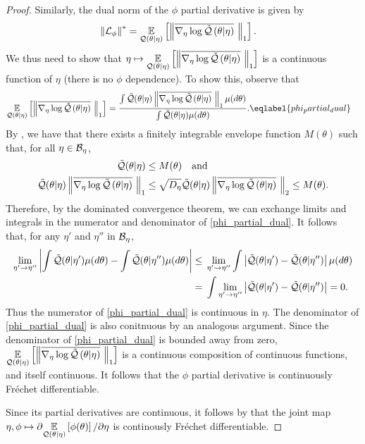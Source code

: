\begin{lem}
\begin{proof}
Similarly, the dual norm of the $\phi$ partial derivative is given by
%
\begin{align*}
%
\norm{\linop_\phi}^* ={}& \expect{\q(\theta \vert \eta)}
       {\norm{\lqgradbar{\theta \vert \eta}}_1}.
%
\end{align*}
%
We thus need to show that $\eta \mapsto \underset{\mathcal{Q}(\theta \vert \eta)}{\mathbb{E}}\left[\left\Vert\overline{{\nabla_\eta \log \tilde{\mathcal{Q}}}\left(\theta \vert \eta\right)}\,\,\right\Vert_1\right]$ is a continuous function of $\eta$
(there is no $\phi$ dependence).  To show this, observe that
%
\begin{align}
%
\expect{\q(\theta \vert \eta)}
       {\norm{\lqgradbar{\theta \vert \eta}}_1} ={}&
\frac{\int \qtil(\theta \vert \eta)
           \norm{\lqgradbar{\theta \vert \eta}}_1 \mu(d\theta)}
     {\int \qtil(\theta \vert \eta) \mu(d\theta)}.
    \eqlabel{phi_partial_dual}
%
\end{align}
%
By , we have that there exists a finitely integrable
envelope function $M(\theta)$ such that, for all $\eta \in \mathcal{B}_\eta$,
%
\begin{align*}
%
\qtil(\theta \vert \eta) \le{}& M(\theta) \mathand \\
\qtil(\theta \vert \eta)
           \norm{\lqgradbar{\theta \vert \eta}}_1
    \le{}&
\sqrt{\etadim} \qtil(\theta \vert \eta)
           \norm{\lqgradbar{\theta \vert \eta}}_2
           \le{} M(\theta).
%
\end{align*}
%
Therefore, by the dominated convergence theorem, we can exchange limits and
integrals in the numerator and denominator of \eqref{phi_partial_dual}.  It
follows that, for any $\eta'$ and $\eta''$ in $\mathcal{B}_\eta$,
%
\begin{align*}
%
\lim_{\eta' \rightarrow \eta''}
\abs{\int \qtil(\theta \vert \eta') \mu(d\theta) -
     \int \qtil(\theta \vert \eta'') \mu(d\theta)}
\le{}&
\lim_{\eta' \rightarrow \eta''}
\int  \abs{\qtil(\theta \vert \eta') - \qtil(\theta \vert \eta'')}
\mu(d\theta)
\\={}&
\int \lim_{\eta' \rightarrow \eta''}  \abs{
\qtil(\theta \vert \eta') - \qtil(\theta \vert \eta'')
}
={} 0.
%
\end{align*}
%
Thus the numerator of \eqref{phi_partial_dual} is continuous in $\eta$. The
denominator of \eqref{phi_partial_dual} is also conitnuous by an analogous
argument.  Since the denominator of \eqref{phi_partial_dual} is bounded away
from zero, $\underset{\mathcal{Q}(\theta \vert \eta)}{\mathbb{E}}\left[\left\Vert\overline{{\nabla_\eta \log \tilde{\mathcal{Q}}}\left(\theta \vert
\eta\right)}\,\,\right\Vert_1\right]$ is a continuous composition of continuous functions, and itself
continuous.  It follows that the $\phi$ partial derivative is
continuously Fr{\'e}chet differentiable.

Since its partial derivatives are continuous, it follows by \citet[Proposition
4.14(c)]{zeidler:2013:functional} that the joint map $\eta, \phi \mapsto
\partial \underset{\mathcal{Q}(\theta \vert \eta)}{\mathbb{E}}\left[\phi(\theta)\right] / \partial \eta$ is
continously Fr{\'e}chet differentiable.

\end{proof}
%
\end{lem}


